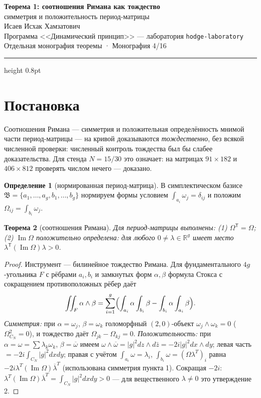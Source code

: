 \documentclass[11pt,a4paper]{article}
\theoremstyle{plain}
\newtheorem{theorem}{Теорема}
\theoremstyle{definition}
\newtheorem{definition}[theorem]{Определение}
\theoremstyle{remark}
\newcommand{\RR}{\mathbb{R}}
\newcommand{\im}{\operatorname{Im}}
\begin{document}
\begin{center}
{\LARGE\bfseries Теорема 1: соотношения Римана как тождество}\\[0.4em]
{\large симметрия и положительность период-матрицы}\\[0.6em]
{\normalsize Исаев Исхак Хамзатович}\\[0.2em]
{\small Программа <<Динамический принцип>> --- лаборатория \texttt{hodge-laboratory}}\\[0.15em]
{\small Отдельная монография теоремы · Монография 4/16}
\end{center}
\vspace{0.4em}
{\color{linkblue}\hrule height 0.8pt}
\vspace{0.8em}

\section{Постановка}

Соотношения Римана --- симметрия и положительная определённость
мнимой части период-матрицы --- на кривой доказываются
\emph{тождественно}, без всякой численной проверки: численный
контроль тождества был бы слабее доказательства. Для стенда
$N=15/30$ это означает: на матрицах $91\times182$ и $406\times812$
проверять числом нечего --- доказано.

\begin{definition}[нормированная период-матрица]
В симплектическом базисе
$\mathfrak{B}=\{a_1,\dots,a_g,b_1,\dots,b_g\}$ нормируем формы
условием $\int_{a_i}\omega_j=\delta_{ij}$ и положим
$\Omega_{ij}=\int_{b_i}\omega_j$.
\end{definition}

\begin{theorem}[соотношения Римана]\label{th:riemann}
Для период-матрицы выполнены:
(1) $\Omega^{\mathsf{T}}=\Omega$;
(2) $\im\Omega$ положительно определена: для любого
$0\ne\lambda\in\RR^g$ имеет место
$\lambda^{\mathsf{T}}(\im\Omega)\lambda>0$.
\end{theorem}

\begin{proof}
Инструмент --- билинейное тождество Римана. Для фундаментального
$4g$-угольника $F$ с рёбрами $a_i,b_i$ и замкнутых форм
$\alpha,\beta$ формула Стокса с сокращением противоположных рёбер
даёт
\[
  \iint_F \alpha\wedge\beta
  =\sum_{i=1}^{g}\Bigl(
    \int_{a_i}\alpha\int_{b_i}\beta
    -\int_{b_i}\alpha\int_{a_i}\beta\Bigr).
\]
\emph{Симметрия:} при $\alpha=\omega_j$, $\beta=\omega_k$ голоморфный
$(2,0)$-объект $\omega_j\wedge\omega_k=0$
($\Omega^2_{C_N}=0$), и тождество даёт $\Omega_{jk}-\Omega_{kj}=0$.
\emph{Положительность:} при
$\alpha=\omega=\sum\lambda_k\omega_k$,
$\beta=\overline{\omega}$ имеем
$\omega\wedge\overline{\omega}=|g|^2dz\wedge d\bar z
=-2i|g|^2dx\wedge dy$; левая часть
$=-2i\int_{C_N}|g|^2dxdy$; правая с учётом
$\int_{a_i}\omega=\lambda_i$, $\int_{b_i}\omega=(\Omega\lambda^T)_i$
равна $-2i\lambda^T(\im\Omega)\overline{\lambda}^T$ (использована
симметрия пункта 1). Сокращая $-2i$:
$\lambda^T(\im\Omega)\overline{\lambda}^T=\int_{C_N}|g|^2dxdy>0$
--- для вещественного $\lambda\ne0$ это утверждение 2.
\end{proof}
\end{document}
